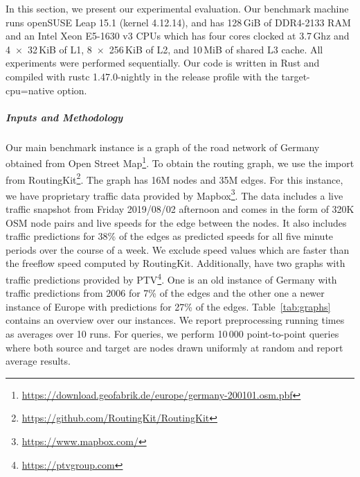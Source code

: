 \documentclass[letterpaper]{article} %
\begin{document}
In this section, we present our experimental evaluation.
Our benchmark machine runs openSUSE Leap 15.1 (kernel 4.12.14), and has 128\,GiB of DDR4-2133 RAM and an Intel Xeon E5-1630 v3 CPUs which has four cores clocked at 3.7\,Ghz and 4~$\times$~32\,KiB of L1, 8~$\times$~256\,KiB of L2, and 10\,MiB of shared L3 cache.
All experiments were performed sequentially.
Our code is written in Rust and compiled with rustc 1.47.0-nightly in the release profile with the target-cpu=native option.

\subparagraph{Inputs and Methodology}
Our main benchmark instance is a graph of the road network of Germany obtained from Open Street Map\footnote{\url{https://download.geofabrik.de/europe/germany-200101.osm.pbf}}.
To obtain the routing graph, we use the import from RoutingKit\footnote{\url{https://github.com/RoutingKit/RoutingKit}}.
The graph has 16M nodes and 35M edges.
For this instance, we have proprietary traffic data provided by Mapbox\footnote{\url{https://www.mapbox.com/}}.
The  data includes a live traffic snapshot from Friday 2019/08/02 afternoon and comes in the form of 320K OSM node pairs and live speeds for the edge between the nodes.
It also includes traffic predictions for 38\% of the edges as predicted speeds for all five minute periods over the course of a week.
We exclude speed values which are faster than the freeflow speed computed by RoutingKit.
Additionally, have two graphs with traffic predictions provided by PTV\footnote{\url{https://ptvgroup.com}}.
One is an old instance of Germany with traffic predictions from 2006 for 7\% of the edges and the other one a newer instance of Europe with predictions for 27\% of the edges.
Table~\ref{tab:graphs} contains an overview over our instances.
We report preprocessing running times as averages over 10 runs.
For queries, we perform 10\,000 point-to-point queries where both source and target are nodes drawn uniformly at random and report average results.
\end{document}
